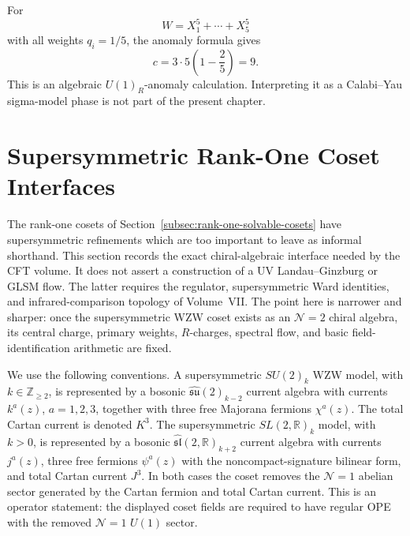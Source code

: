 \begin{example}
\label{ex:quintic-lg-algebraic-check}
For
\[
  W=X_1^5+\cdots+X_5^5
\]
with all weights \(q_i=1/5\), the anomaly formula gives
\begin{equation}
  c=3\cdot 5\left(1-\frac25\right)=9.
  \label{eq:quintic-lg-central-charge}
\end{equation}
This is an algebraic \(U(1)_R\)-anomaly calculation.  Interpreting it as a
Calabi--Yau sigma-model phase is not part of the present chapter.
\end{example}

\section{Supersymmetric Rank-One Coset Interfaces}
\label{sec:supersymmetric-rank-one-coset-interfaces}

The rank-one cosets of
Section~\ref{subsec:rank-one-solvable-cosets} have supersymmetric
refinements which are too important to leave as informal shorthand.  This section
records the exact chiral-algebraic interface needed by the CFT volume.  It
does not assert a construction of a UV Landau--Ginzburg or GLSM flow.  The
latter requires the regulator, supersymmetric Ward identities, and
infrared-comparison topology of Volume~VII.  The point here is narrower and
sharper: once the supersymmetric WZW coset exists as an \(\mathcal N=2\)
chiral algebra, its central charge, primary weights, \(R\)-charges, spectral
flow, and basic field-identification arithmetic are fixed.

We use the following conventions.  A supersymmetric \(SU(2)_k\) WZW model,
with \(k\in\mathbb Z_{\ge2}\), is represented by a bosonic
\(\widehat{\mathfrak{su}}(2)_{k-2}\) current algebra with currents
\(k^a(z)\), \(a=1,2,3\), together with three free Majorana fermions
\(\chi^a(z)\).  The total Cartan current is denoted \(K^3\).  The
supersymmetric \(SL(2,\mathbb R)_k\) model, with \(k>0\), is represented by
a bosonic \(\widehat{\mathfrak{sl}}(2,\mathbb R)_{k+2}\) current algebra with
currents \(j^a(z)\), three free fermions \(\psi^a(z)\) with the
noncompact-signature bilinear form, and total Cartan current \(J^3\).  In
both cases the coset removes the \(\mathcal N=1\) abelian sector generated
by the Cartan fermion and total Cartan current.  This is an operator
statement: the displayed coset fields are required to have regular OPE with
the removed \(\mathcal N=1\) \(U(1)\) sector.

